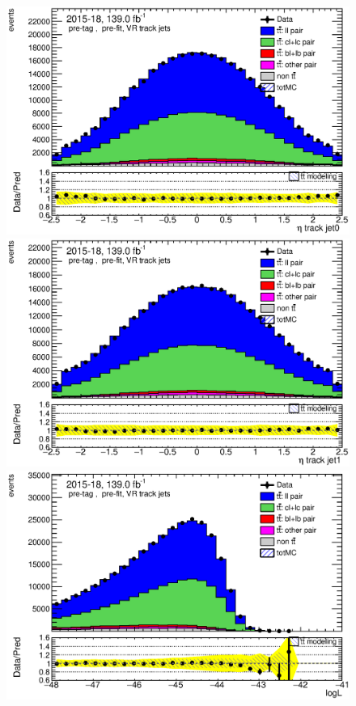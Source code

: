 \documentclass[letterpaper,12pt]{article}
\begin{document}
	
	\begin{figure}
	\begin{minipage}[b]{.45\textwidth}
	\centering
	\includegraphics[width=1\textwidth]{Oct_distributions/pretagNoRwDL1rwithhighpTVRJets_scaledall/DataMC_J0_eta.eps}
	\end{minipage}\hfill
	\begin{minipage}[b]{.45\textwidth}
	\centering
	\includegraphics[width=1\textwidth]{Oct_distributions/pretagNoRwDL1rwithhighpTVRJets_scaledall/DataMC_J1_eta.eps}
	\end{minipage}\hfill
	\begin{minipage}[b]{.45\textwidth}
	\centering
	\includegraphics[width=1\textwidth]{Oct_distributions/pretagNoRwDL1rwithhighpTVRJets_scaledall/DataMC_LLR.eps}

\end{minipage}
\end{figure}
\end{document}
